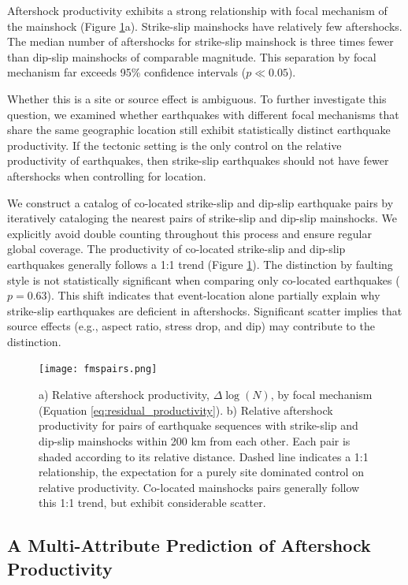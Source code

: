 \documentclass[draft, jgrga]{agujournal2018}
\begin{document}
    Aftershock productivity exhibits a strong relationship with focal mechanism of the mainshock (Figure \ref{fig:coloc}a). Strike-slip mainshocks have relatively few aftershocks. The median number of aftershocks for strike-slip mainshock is three times fewer than dip-slip mainshocks of comparable magnitude. This separation by focal mechanism far exceeds 95\% confidence intervals ($p\ll 0.05$).

    Whether this is a site or source effect is ambiguous. To further investigate this question, we examined whether earthquakes with different focal mechanisms that share the same geographic location still exhibit statistically distinct earthquake productivity. If the tectonic setting is the only control on the relative productivity of earthquakes, then strike-slip earthquakes should not have fewer aftershocks when controlling for location.

    We construct a catalog of co-located strike-slip and dip-slip earthquake pairs by iteratively cataloging the nearest pairs of strike-slip and dip-slip mainshocks. We explicitly avoid double counting throughout this process and ensure regular global coverage. The productivity of co-located strike-slip and dip-slip earthquakes generally follows a 1:1 trend (Figure \ref{fig:coloc}). The distinction by faulting style is not statistically significant when comparing only co-located earthquakes ($p = 0.63$). This shift indicates that event-location alone partially explain why strike-slip earthquakes are deficient in aftershocks. Significant scatter implies that source effects (e.g., aspect ratio, stress drop, and dip) may contribute to the distinction.

    \begin{figure}
        \centering
        \texttt{[image: fmspairs.png]}
        \caption{a) Relative aftershock productivity, $\Delta \log(N)$, by focal mechanism (Equation \ref{eq:residual_productivity}). b) Relative aftershock productivity for pairs of earthquake sequences with strike-slip and dip-slip mainshocks within 200 km from each other. Each pair is shaded according to its relative distance. Dashed line indicates a 1:1 relationship, the expectation for a purely site dominated control on relative productivity. Co-located mainshocks pairs generally follow this 1:1 trend, but exhibit considerable scatter.}
        \label{fig:coloc}
    \end{figure}

    \subsection{A Multi-Attribute Prediction of Aftershock Productivity}
\end{document}
